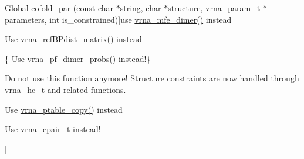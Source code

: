 \begin{DoxyRefList}
Global \hyperlink{group__mfe__cofold_ga7612cfeeb1b793f1e4179b1eb53df1f3}{cofold\-\_\-par} (const char $\ast$string, char $\ast$structure, vrna\-\_\-param\-\_\-t $\ast$parameters, int is\-\_\-constrained)]use \hyperlink{group__mfe__cofold_gaab22d10c1190f205f16a77cab9d5d3ee}{vrna\-\_\-mfe\-\_\-dimer()} instead 
\item[\label{deprecated__deprecated000138}%
\hypertarget{deprecated__deprecated000138}{}%
Global \hyperlink{group__struct__utils_gadd463184355d0803b6ee6e09f29182f2}{compute\-\_\-\-B\-Pdifferences} (short $\ast$pt1, short $\ast$pt2, unsigned int turn)]Use \hyperlink{group__struct__utils_ga5a27bd058183170afd4716f5b8ff511a}{vrna\-\_\-ref\-B\-Pdist\-\_\-matrix()} instead  
\item[\label{deprecated__deprecated000112}%
\hypertarget{deprecated__deprecated000112}{}%
Global \hyperlink{part__func__co_8h_a21f8f4a97f904d5d805d571081b2f5f9}{compute\-\_\-probabilities} (double F\-A\-B, double F\-E\-A, double F\-E\-B, vrna\-\_\-plist\-\_\-t $\ast$pr\-A\-B, vrna\-\_\-plist\-\_\-t $\ast$pr\-A, vrna\-\_\-plist\-\_\-t $\ast$pr\-B, int Alength)]\{ Use \hyperlink{group__pf__cofold_gaf04708a63d2385d5959db9f886741479}{vrna\-\_\-pf\-\_\-dimer\-\_\-probs()} instead!\} 
\item[\label{deprecated__deprecated000041}%
\hypertarget{deprecated__deprecated000041}{}%
Global \hyperlink{constraints_8h_a36c3a6c3218b041f992052767bc74549}{constrain\-\_\-ptypes} (const char $\ast$constraint, unsigned int length, char $\ast$ptype, int $\ast$\-B\-P, int min\-\_\-loop\-\_\-size, unsigned int idx\-\_\-type)]Do not use this function anymore! Structure constraints are now handled through \hyperlink{group__constraints_gac7e4c4f8abe3163a68110c5bff24e01d}{vrna\-\_\-hc\-\_\-t} and related functions. 
\item[\label{deprecated__deprecated000133}%
\hypertarget{deprecated__deprecated000133}{}%
Global \hyperlink{group__struct__utils_gafeaa6d68eef3a99d0a7aa08aa91c6601}{copy\-\_\-pair\-\_\-table} (const short $\ast$pt)]Use \hyperlink{group__struct__utils_ga2daefbbd6d9f8803731651882f54332d}{vrna\-\_\-ptable\-\_\-copy()} instead 
\item[\label{deprecated__deprecated000044}%
\hypertarget{deprecated__deprecated000044}{}%
Global \hyperlink{group__data__structures_ga8412f116a2eb07b59ade9e14ca7c5ef1}{cpair} ]Use \hyperlink{group__data__structures_gae4fc91141cc69c6d8eaf1332cb991ecc}{vrna\-\_\-cpair\-\_\-t} instead!  
\item[\label{deprecated__deprecated000016}%
\hypertarget{deprecated__deprecated000016}{}%

\end{DoxyRefList}
